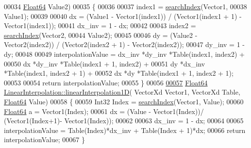 \begin{DoxyCode}
00034                                                    \hyperlink{group___tools_ga3f1431cb9f76da10f59246d1d743dc2c}{Float64} Value2)
00035 \{
00036 
00037     index1 = \hyperlink{class_linear_interpolation_a0be6504a98fabcd63d81d30a2d2d9add}{searchIndex}(Vector1,
00038                          Value1);
00039 
00040     dx = (Value1 - Vector1(index1)) / (Vector1(index1 + 1) - Vector1(index1));
00041     dx\_inv = 1 - dx;
00042 
00043     index2 = \hyperlink{class_linear_interpolation_a0be6504a98fabcd63d81d30a2d2d9add}{searchIndex}(Vector2,
00044         Value2);
00045 
00046     dy = (Value2 - Vector2(index2)) / (Vector2(index2 + 1) - Vector2(index2));
00047     dy\_inv = 1 - dy;
00048 
00049     interpolationValue =    dx\_inv  *dy\_inv *Table(index1, index2) +
00050                             dx      *dy\_inv *Table(index1 + 1, index2) +
00051                             dy      *dx\_inv *Table(index1, index2 + 1) +
00052                             dx      *dy     *Table(index1 + 1, index2 + 1);
00053 
00054     \textcolor{keywordflow}{return} interpolationValue;
00055 \}
00056 
\hyperlink{class_linear_interpolation_a76b750166902dedda7e44ed0b8170094}{00057} \hyperlink{group___tools_ga3f1431cb9f76da10f59246d1d743dc2c}{Float64} \hyperlink{class_linear_interpolation_a76b750166902dedda7e44ed0b8170094}{LinearInterpolation::linearInterpolation1D}(
      VectorXd Vector1, VectorXd Table, \hyperlink{group___tools_ga3f1431cb9f76da10f59246d1d743dc2c}{Float64} Value)
00058 \{
00059     Int32 Index = \hyperlink{class_linear_interpolation_a0be6504a98fabcd63d81d30a2d2d9add}{searchIndex}(Vector1, Value);
00060     \hyperlink{group___tools_ga3f1431cb9f76da10f59246d1d743dc2c}{Float64} a = Vector1(Index);
00061     dx = (Value - Vector1(Index))/ (Vector1(Index+1)- Vector1(Index));
00062 
00063     dx\_inv = 1 - dx;
00064 
00065     interpolationValue = Table(Index)*dx\_inv + Table(Index + 1)*dx;
00066     \textcolor{keywordflow}{return} interpolationValue;
00067 \}
\end{DoxyCode}
